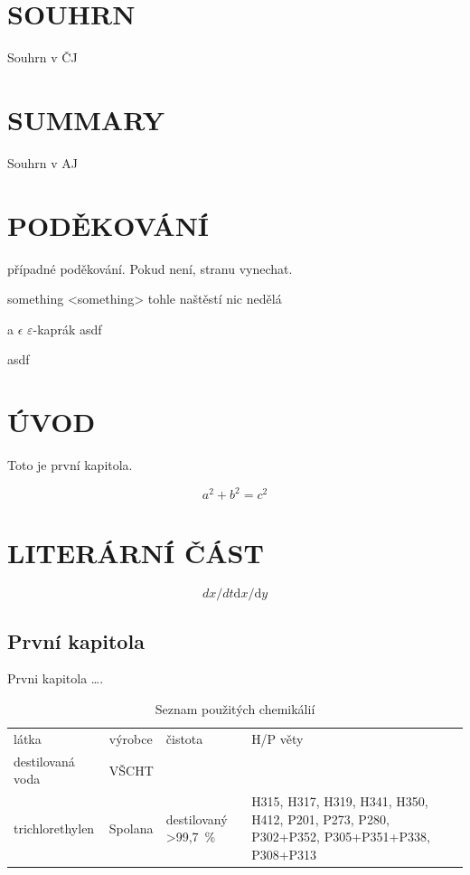 \documentclass[a4paper, 12pt]{article}
\def\D{\mathrm{d}}
\begin{document}
%
%
\section*{SOUHRN}

Souhrn v ČJ

\section*{SUMMARY}
Souhrn v AJ

%
%
\newpage
\section*{PODĚKOVÁNÍ}
případné poděkování. Pokud není, stranu vynechat.

something <something> tohle naštěstí nic nedělá

a $\epsilon$ $\varepsilon$-kaprák \hspace{2cm} asdf \vspace{2cm}

asdf

\tableofcontents
\newpage

\section{ÚVOD}
Toto je první kapitola.

\begin{equation}
a^2 + b^2 = c^2
\end{equation}

\newpage
\section{LITERÁRNÍ ČÁST}
\begin{equation}
dx/dt \D x / \D y
\end{equation}

\subsection{První kapitola}
Prvni kapitola \ldots.


\begin{table}[h]
\caption{Seznam použitých chemikálií} \label{tab:chemicals_materials}
\begin{tabularx}{\textwidth}{llp{1.9cm}Z}
látka & výrobce & čistota & H/P věty \\
destilovaná voda & VŠCHT &  &  \\
trichlorethylen & Spolana & destilovaný >99,7~\% & H315, H317, H319, H341, H350, H412, P201, P273, P280, P302+P352, P305+P351+P338, P308+P313 \\
\end{tabularx}
\end{table}
\end{document}

